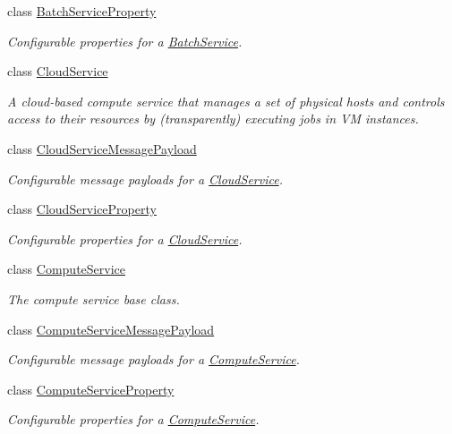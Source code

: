\begin{DoxyCompactItemize}
class \hyperlink{classwrench_1_1_batch_service_property}{Batch\+Service\+Property}
\begin{DoxyCompactList}\small\item\em Configurable properties for a \hyperlink{classwrench_1_1_batch_service}{Batch\+Service}. \end{DoxyCompactList}\item 
class \hyperlink{classwrench_1_1_cloud_service}{Cloud\+Service}
\begin{DoxyCompactList}\small\item\em A cloud-\/based compute service that manages a set of physical hosts and controls access to their resources by (transparently) executing jobs in VM instances. \end{DoxyCompactList}\item 
class \hyperlink{classwrench_1_1_cloud_service_message_payload}{Cloud\+Service\+Message\+Payload}
\begin{DoxyCompactList}\small\item\em Configurable message payloads for a \hyperlink{classwrench_1_1_cloud_service}{Cloud\+Service}. \end{DoxyCompactList}\item 
class \hyperlink{classwrench_1_1_cloud_service_property}{Cloud\+Service\+Property}
\begin{DoxyCompactList}\small\item\em Configurable properties for a \hyperlink{classwrench_1_1_cloud_service}{Cloud\+Service}. \end{DoxyCompactList}\item 
class \hyperlink{classwrench_1_1_compute_service}{Compute\+Service}
\begin{DoxyCompactList}\small\item\em The compute service base class. \end{DoxyCompactList}\item 
class \hyperlink{classwrench_1_1_compute_service_message_payload}{Compute\+Service\+Message\+Payload}
\begin{DoxyCompactList}\small\item\em Configurable message payloads for a \hyperlink{classwrench_1_1_compute_service}{Compute\+Service}. \end{DoxyCompactList}\item 
class \hyperlink{classwrench_1_1_compute_service_property}{Compute\+Service\+Property}
\begin{DoxyCompactList}\small\item\em Configurable properties for a \hyperlink{classwrench_1_1_compute_service}{Compute\+Service}. \end{DoxyCompactList}\item 

\end{DoxyCompactItemize}
